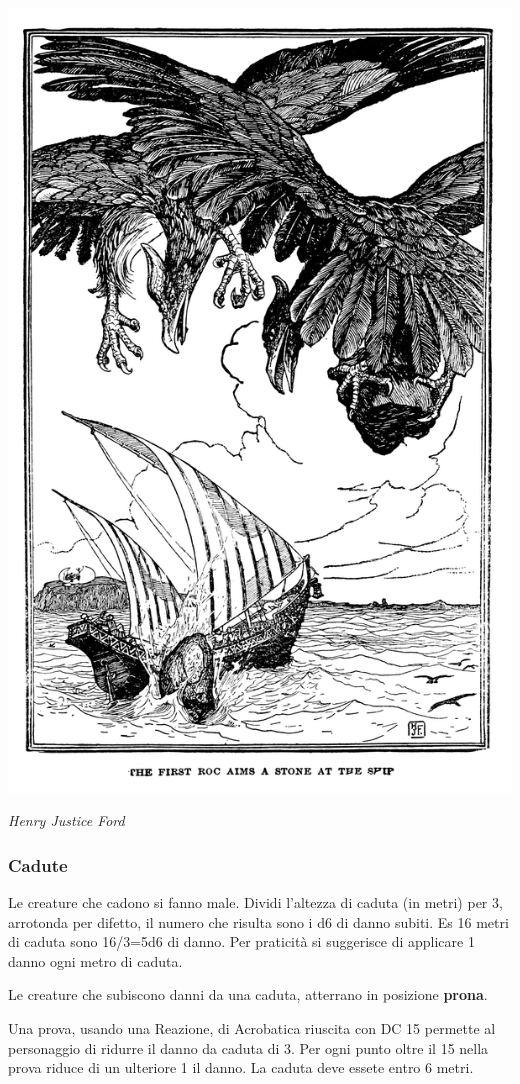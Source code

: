 \begin{multicols}{2}
\begin{center}
\includegraphics[width=0.75\linewidth]{immagini/oggetticadenti.png}

\emph{Henry Justice Ford}
\end{center}

\subsubsection{Cadute}\hypertarget{cadute}{}\label{cadute}

Le creature che cadono si fanno male. Dividi l'altezza di caduta (in metri) per 3, arrotonda per difetto, il numero che risulta sono i d6 di danno subiti. Es 16 metri di caduta sono 16/3=5d6 di danno. Per praticità si suggerisce di applicare 1 danno ogni metro di caduta.

Le creature che subiscono danni da una caduta, atterrano in posizione \textbf{prona}.

Una prova, usando una Reazione, di Acrobatica riuscita con DC 15 permette al personaggio di ridurre il danno da caduta di 3. Per ogni punto oltre il 15 nella prova riduce di un ulteriore 1 il danno. La caduta deve essete entro 6 metri.


\end{multicols}
